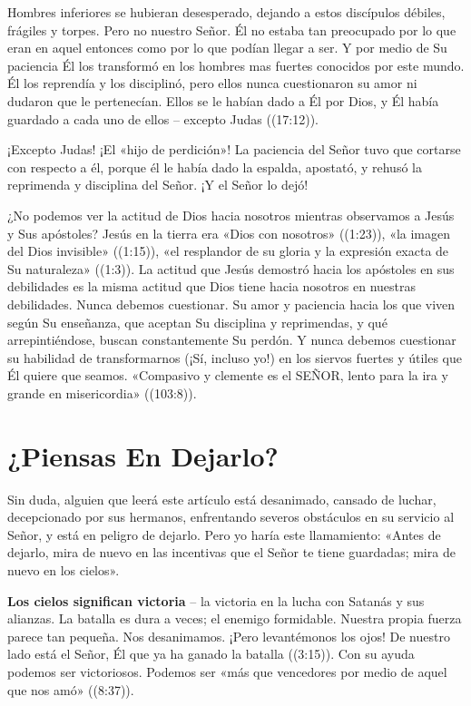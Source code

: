 \documentclass[12pt, twoside, openright]{book}
\begin{document}
Hombres inferiores se hubieran desesperado, dejando a estos discípulos débiles, frágiles y torpes. Pero no nuestro Señor. Él no estaba tan preocupado por lo que eran en aquel entonces como por lo que podían llegar a ser. Y por medio de Su paciencia Él los transformó en los hombres mas fuertes conocidos por este mundo. Él los reprendía y los disciplinó, pero ellos nunca cuestionaron su amor ni dudaron que le pertenecían. Ellos se le habían dado a Él por Dios, y Él había guardado a cada uno de ellos – excepto Judas ((17:12)). 

¡Excepto Judas! ¡El «hijo de perdición»! La paciencia del Señor tuvo que cortarse con respecto a él, porque él le había dado la espalda, apostató, y rehusó la reprimenda y disciplina del Señor. ¡Y el Señor lo dejó!

¿No podemos ver la actitud de Dios hacia nosotros mientras observamos a Jesús y Sus apóstoles? Jesús en la tierra era «Dios con nosotros» ((1:23)), «la imagen del Dios invisible» ((1:15)), «el resplandor de su gloria y la expresión exacta de Su naturaleza» ((1:3)). La actitud que Jesús demostró hacia los apóstoles en sus debilidades es la misma actitud que Dios tiene hacia nosotros en nuestras debilidades. Nunca debemos cuestionar. Su amor y paciencia hacia los que viven según Su enseñanza, que aceptan Su disciplina y reprimendas, y qué arrepintiéndose, buscan constantemente Su perdón. Y nunca debemos cuestionar su habilidad de transformarnos (¡Sí, incluso yo!) en los siervos fuertes y útiles que Él quiere que seamos. «Compasivo y clemente es el SEÑOR, lento para la ira y grande en misericordia» ((103:8)).

\section{¿Piensas En Dejarlo?}
Sin duda, alguien que leerá este artículo está desanimado, cansado de luchar, decepcionado por sus hermanos, enfrentando severos obstáculos en su servicio al Señor, y está en peligro de dejarlo. Pero yo haría este llamamiento: «Antes de dejarlo, mira de nuevo en las incentivas que el Señor te tiene guardadas; mira de nuevo en los cielos».

\textbf{Los cielos significan victoria} – la victoria en la lucha con Satanás y sus alianzas. La batalla es dura a veces; el enemigo formidable. Nuestra propia fuerza parece tan pequeña. Nos desanimamos. ¡Pero levantémonos los ojos! De nuestro lado está el Señor, Él que ya ha ganado la batalla ((3:15)). Con su ayuda podemos ser victoriosos. Podemos ser «más que vencedores por medio de aquel que nos amó» ((8:37)).
\end{document}
